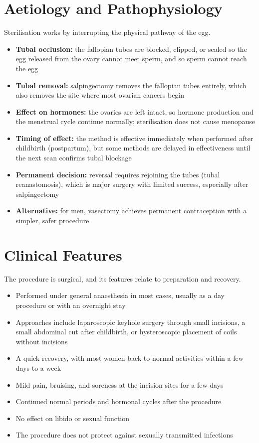 \section*{Aetiology and Pathophysiology}
Sterilisation works by interrupting the physical pathway of the egg.
\begin{itemize}
    \item \textbf{Tubal occlusion:} the fallopian tubes are blocked, clipped, or sealed so the egg released from the ovary cannot meet sperm, and so sperm cannot reach the egg
    \item \textbf{Tubal removal:} salpingectomy removes the fallopian tubes entirely, which also removes the site where most ovarian cancers begin
    \item \textbf{Effect on hormones:} the ovaries are left intact, so hormone production and the menstrual cycle continue normally; sterilisation does not cause menopause
    \item \textbf{Timing of effect:} the method is effective immediately when performed after childbirth (postpartum), but some methods are delayed in effectiveness until the next scan confirms tubal blockage
    \item \textbf{Permanent decision:} reversal requires rejoining the tubes (tubal reanastomosis), which is major surgery with limited success, especially after salpingectomy
    \item \textbf{Alternative:} for men, vasectomy achieves permanent contraception with a simpler, safer procedure
\end{itemize}

\section*{Clinical Features}
The procedure is surgical, and its features relate to preparation and recovery.
\begin{itemize}
    \item Performed under general anaesthesia in most cases, usually as a day procedure or with an overnight stay
    \item Approaches include laparoscopic keyhole surgery through small incisions, a small abdominal cut after childbirth, or hysteroscopic placement of coils without incisions
    \item A quick recovery, with most women back to normal activities within a few days to a week
    \item Mild pain, bruising, and soreness at the incision sites for a few days
    \item Continued normal periods and hormonal cycles after the procedure
    \item No effect on libido or sexual function
    \item The procedure does not protect against sexually transmitted infections
\end{itemize}

